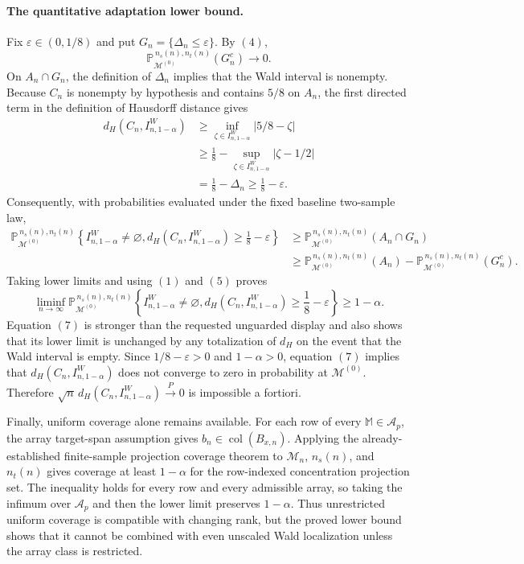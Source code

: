 \paragraph{The quantitative adaptation lower bound.}
Fix \(\varepsilon\in(0,1/8)\) and put \(G_n=\{\Delta_n\le\varepsilon\}\). By \((4)\),
\[
\mathbb P_{\mathcal M^{(0)}}^{\,n_s(n),n_t(n)}(G_n^c)\longrightarrow0. \tag{5}
\]
On \(A_n\cap G_n\), the definition of \(\Delta_n\) implies that the Wald interval is nonempty. Because \(C_n\) is nonempty by hypothesis and contains \(5/8\) on \(A_n\), the first directed term in the definition of Hausdorff distance gives
\[
\begin{split}
d_H(C_n,I^W_{n,1-\alpha})
&\ge\inf_{\zeta\in I^W_{n,1-\alpha}}|5/8-\zeta|\\
&\ge\frac18-
\sup_{\zeta\in I^W_{n,1-\alpha}}|\zeta-1/2|\\
&=\frac18-\Delta_n
\ge\frac18-\varepsilon. \tag{6}
\end{split}
\]
Consequently, with probabilities evaluated under the fixed baseline two-sample law,
\[
\begin{split}
\mathbb P_{\mathcal M^{(0)}}^{\,n_s(n),n_t(n)}
\left\{I^W_{n,1-\alpha}\ne\varnothing,
d_H(C_n,I^W_{n,1-\alpha})\ge\frac18-\varepsilon\right\}
&\ge \mathbb P_{\mathcal M^{(0)}}^{\,n_s(n),n_t(n)}(A_n\cap G_n)\\
&\ge \mathbb P_{\mathcal M^{(0)}}^{\,n_s(n),n_t(n)}(A_n)
-\mathbb P_{\mathcal M^{(0)}}^{\,n_s(n),n_t(n)}(G_n^c).
\end{split}
\]
Taking lower limits and using \((1)\) and \((5)\) proves
\[
\liminf_{n\to\infty}
\mathbb P_{\mathcal M^{(0)}}^{\,n_s(n),n_t(n)}
\left\{I^W_{n,1-\alpha}\ne\varnothing,
d_H(C_n,I^W_{n,1-\alpha})\ge\frac18-\varepsilon\right\}
\ge1-\alpha. \tag{7}
\]
Equation \((7)\) is stronger than the requested unguarded display and also shows that its lower limit is unchanged by any totalization of \(d_H\) on the event that the Wald interval is empty. Since \(1/8-\varepsilon>0\) and \(1-\alpha>0\), equation \((7)\) implies that \(d_H(C_n,I^W_{n,1-\alpha})\) does not converge to zero in probability at \(\mathcal M^{(0)}\). Therefore \(\sqrt n\,d_H(C_n,I^W_{n,1-\alpha})\xrightarrow{P}0\) is impossible a fortiori.

Finally, uniform coverage alone remains available. For each row of every \(\mathbb M\in\mathcal A_p\), the array target-span assumption gives \(b_n\in\operatorname{col}(B_{x,n})\). Applying the already-established finite-sample projection coverage theorem to \(\mathcal M_n\), \(n_s(n)\), and \(n_t(n)\) gives coverage at least \(1-\alpha\) for the row-indexed concentration projection set. The inequality holds for every row and every admissible array, so taking the infimum over \(\mathcal A_p\) and then the lower limit preserves \(1-\alpha\). Thus unrestricted uniform coverage is compatible with changing rank, but the proved lower bound shows that it cannot be combined with even unscaled Wald localization unless the array class is restricted.